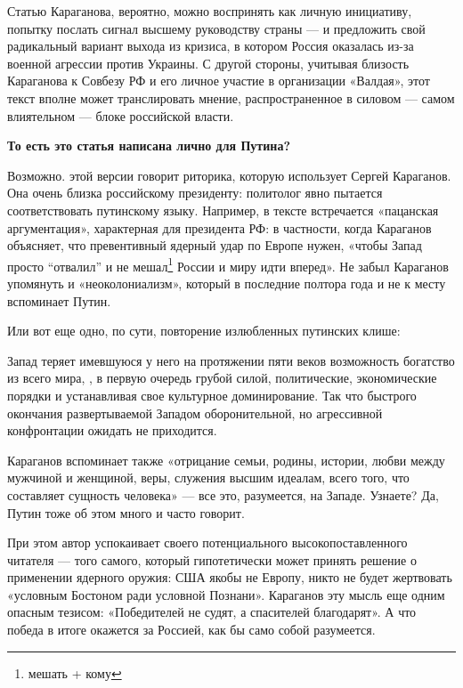 Статью Караганова, вероятно, можно воспринять как личную инициативу, попытку послать сигнал высшему руководству страны — и предложить свой радикальный вариант выхода из кризиса, в котором Россия оказалась из-за военной агрессии против Украины. С другой стороны, учитывая близость Караганова к Совбезу РФ и его личное участие в организации «Валдая», этот текст вполне может транслировать мнение, распространенное в силовом — самом влиятельном — блоке российской власти.

\textbf{То есть это статья написана лично для Путина?}

Возможно.  этой версии говорит риторика, которую использует Сергей Караганов. Она очень близка российскому президенту: политолог явно пытается соответствовать путинскому языку. Например, в тексте встречается «пацанская аргументация», характерная для президента РФ: в частности, когда Караганов объясняет, что превентивный ядерный удар по Европе нужен, «чтобы Запад просто ``отвалил'' и не мешал\footnote{мешать + кому} России и миру идти вперед». Не забыл Караганов упомянуть и «неоколониализм», который в последние полтора года  и не к месту вспоминает Путин.

Или вот еще одно, по сути, повторение излюбленных путинских клише:

\begin{fancyquotes}
    Запад теряет имевшуюся у него на протяжении пяти веков возможность  богатство из всего мира, , в первую очередь грубой силой, политические, экономические порядки и устанавливая свое культурное доминирование. Так что быстрого окончания развертываемой Западом оборонительной, но агрессивной конфронтации ожидать не приходится.
\end{fancyquotes}

Караганов вспоминает также «отрицание семьи, родины, истории, любви между мужчиной и женщиной, веры, служения высшим идеалам, всего того, что составляет сущность человека» --- все это, разумеется, на Западе. Узнаете? Да, Путин тоже об этом много и часто говорит.

При этом автор успокаивает своего потенциального высокопоставленного читателя --- того самого, который гипотетически может принять решение о применении ядерного оружия: США якобы не  Европу, никто не будет жертвовать «условным Бостоном ради условной Познани». Караганов  эту мысль еще одним опасным тезисом: «Победителей не судят, а спасителей благодарят». А что победа в итоге окажется за Россией, как бы само собой разумеется.

